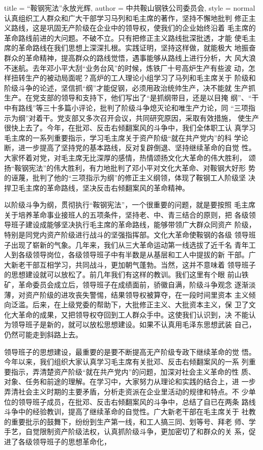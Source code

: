 \begin{hongqiarticle}{
        title  = {“鞍钢宪法”永放光辉},
        author = {中共鞍山钢铁公司委员会},
        style  = normal
    }
    认真组织工人群众和广大干部学习马列和毛主席的著作，坚持不懈地批判
    修正主义路线，这是巩固无产阶级在企业中的领导权，使我们的企业始终沿着
    毛主席的革命路线前进的大问题。不破不立。只有把修正主义路线批深批透，才能
    使毛主席的革命路线在我们思想上深深扎根。实践证明，坚持这样做，就能极大
    地振奋群众的革命精神，提高群众的路线觉悟，遇事能够从路线上进行分析，大
    风大浪不迷航。去年邓小平大刮“业务台风”的时候，炼铁厂十号高炉生产有些波
    动，怎样扭转生产的被动局面呢？高炉的工人理论小组学习了马列和毛主席关于
    阶级和阶级斗争的论述，坚信抓“纲”才能促钢，必须用政治统帅生产，决不能就
    生产抓生产。在党支部的领导和支持下，他们写出了“是抓纲带目，还是以目掩
    纲”、“干中有路线”等三十多篇小评论，批判了阶级斗争熄灭论和唯生产力论，同
    “三项指示为纲”对着干。党支部又多次召开会议，共同研究原因，采取有效措施，
    使生产很快上去了。今年，在批邓、反击右倾翻案风的斗争中，我们全体职工认
    真学习毛主席的一系列重要指示，学习毛主席关于资产阶级“就在共产党内”的科
    学论断，进一步提高了坚持党的基本路线，反对复辟倒退、坚持继续革命的自觉
    性。大家怀着对党，对毛主席无比深厚的感情，热情颂扬文化大革命的伟大胜利，
    颂扬“鞍钢宪法”的伟大胜利，有力地批判了邓小平对文化大革命、对鞍钢大好形
    势的诬蔑，批判了他的“三项指示为纲”的修正主义纲领，体现了鞍钢工人阶级坚
    决捍卫毛主席的革命路线，坚决反击右倾翻案风的革命精神。

    以阶级斗争为纲，贯彻执行“鞍钢宪法”，一个很重要的问题，就是要按照
    毛主席关于培养革命事业接班人的五项条件，坚持老、中、青三结合的原则，把
    各级领导班子建设成能够坚决执行毛主席的革命路线，能够带领广大群众同资产
    阶级，特别是同党内资产阶级进行战斗的坚强指挥部。文化大革命使鞍钢的各级
    领导班子出现了崭新的气象。几年来，我们从三大革命运动第一线选拔了近千名
    青年工人到各级领导岗位，各级领导班子中有半数是从基层和工人中提拔的新
    干部。广大新老干部互相学习，共同战斗，更加朝气蓬勃。当然，这并不意味着
    领导班子的思想建设就可以放松了。前几年我们有这样的教训。我们这里有个眼
    前山铁矿，革命委员会成立后，领导班子在成绩面前，骄徽自满，阶级斗争观念
    逐渐淡薄，对资产阶级的进攻丧失警惕，结果领导权被算夺，在一段时间里资本
    主义倾向泛滥。后来，在上级党委的帮助下，大批修正主义、大批资本主义，保
    卫了文化大革命的成果，又把领导权夺回到工人群众手中。这使我们认识到，决
    不能认为领导班子是新的，就可以放松思想建设。如果不认真用毛泽东思想武装
    自己，仍然可能走到斜路上去。

    领导班子的思想建设，最重要的是要不断提高无产阶级专政下继续革命的觉
    悟。今年以来，我们组织大家认真学习毛主席有关批邓、反击右倾翻案风的一系
    列重要指示，弄清楚资产阶级“就在共产党内”的问题，加深对社会主义革命的性
    质、对象、任务和前途的理解。在学习中，大家努力从理论和实践的结合上，进
    一步弄清社会主义时期的主要矛盾，分析走资派在企业里活动的规律和特点。不
    少单位的领导班子成员，在批邓、反击右倾翻案风的斗争中，总结了自已在两条
    路线斗争中的经验教训，提高了继续革命的自觉性。广大新老干部在毛主席关于
    社教的重要批示的鼓舞下，纷纷到生产第一线，和工人搞三同、划等号、拜老
    师、学手艺，自觉限制资产阶级法权，认真抓阶级斗争，更加密切了和群众的关
    系，促进了各级领导班子的思想革命化，


\end{hongqiarticle}
